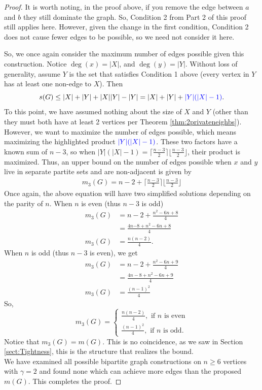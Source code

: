\documentclass[12pt]{amsart}
\newcommand{\bc}[1]{\textcolor{blue}{#1}}
\begin{document}
\begin{proof}
It is worth noting, in the proof above, if you remove the edge between $a$ and $b$ they still dominate the graph. So, Condition 2 from Part 2 of this proof still applies here. However, given the change in the first condition, Condition 2 does not cause fewer edges to be possible, so we need not consider it here. 

So, we once again consider the maximum number of edges possible given this construction. Notice $\deg(x) = |X|$, and $\deg(y) = |Y|$. Without loss of generality, assume $Y$ is the set that satisfies Condition 1 above (every vertex in $Y$ has at least one non-edge to $X$). Then $$s(G) \leq |X| + |Y| + |X||Y| - |Y| = |X| +|Y| + \bc{|Y|(|X| - 1)}.$$
To this point, we have assumed nothing about the size of $X$ and $Y$ (other than they must both have at least 2 vertices per Theorem \ref{thm:2privateneighbs}). However, we want to maximize the number of edges possible, which means maximizing the highlighted product $\bc{|Y|(|X| - 1)}$. These two factors have a known sum of $n - 3$, so when $|Y|(|X| - 1) = \lceil\frac{n-3}{2}\rceil \lfloor \frac{n-3}{2}\rfloor$, their product is maximized. Thus, an upper bound on the number of edges possible when $x$ and $y$ live in separate partite sets and are non-adjacent is given by
\begin{align*}
    m_3(G) = n - 2 + \Big\lceil\frac{n-3}{2}\Big\rceil \Big\lfloor \frac{n-3}{2}\Big\rfloor
\end{align*}
Once again, the above equation will have two simplified solutions depending on the parity of $n$. When $n$ is even (thus $n-3$ is odd)
\begin{align*}
    m_3(G) &= n-2 + \frac{n^2-6n + 8}{4}\\
    &= \frac{4n {-8} +n^2-6n + {8}}{4}\\
    m_3(G)&= \frac{n(n-2)}{4}.
\end{align*}
When $n$ is odd (thus $n-3$ is even), we get 
\begin{align*}
    m_3(G) &= n - 2 + \frac{n^2 - 6n + 9}{4}\\
    &= \frac{4n - 8 + n^2 -6n + 9}{4}\\
    m_3(G) &= \frac{(n-1)^2}{4}
\end{align*}
So, $$m_3(G) = \begin{cases}
    \frac{n(n-2)}{4}, \text{     if $n$ is even}\\
        \frac{(n-1)^2}{4},\text{     if $n$ is odd.}
\end{cases}$$
Notice that $m_3(G) = m(G)$. This is no coincidence, as we saw in Section \ref{sect:Tightness}, this is the structure that realizes the bound.\\

We have examined all possible bipartite graph constructions on $n \geq 6$ vertices with $\gamma = 2$ and found none which can achieve more edges than the proposed $m(G)$. This completes the proof.
\end{proof}
\end{document}
